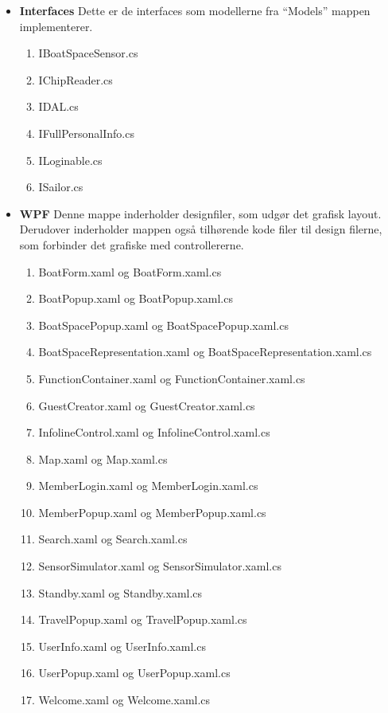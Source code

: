 \begin{itemize}
	\item \textbf{Interfaces} Dette er de interfaces som modellerne fra \enquote{Models} mappen implementerer.
		\begin{enumerate}
			\item IBoatSpaceSensor.cs
			\item IChipReader.cs
			\item IDAL.cs
			\item IFullPersonalInfo.cs
			\item ILoginable.cs
			\item ISailor.cs
		\end{enumerate}
\end{itemize}

\begin{itemize}
	\item \textbf{WPF} Denne mappe inderholder designfiler, som udgør det grafisk layout. Derudover inderholder mappen også tilhørende kode filer til design filerne, som forbinder det grafiske med controllererne.
		\begin{enumerate}
			\item BoatForm.xaml og BoatForm.xaml.cs
			\item BoatPopup.xaml og BoatPopup.xaml.cs
			\item BoatSpacePopup.xaml og BoatSpacePopup.xaml.cs
			\item BoatSpaceRepresentation.xaml og BoatSpaceRepresentation.xaml.cs
			\item FunctionContainer.xaml og FunctionContainer.xaml.cs
			\item GuestCreator.xaml og GuestCreator.xaml.cs
			\item InfolineControl.xaml og InfolineControl.xaml.cs
			\item Map.xaml og Map.xaml.cs
			\item MemberLogin.xaml og MemberLogin.xaml.cs
			\item MemberPopup.xaml og MemberPopup.xaml.cs
			\item Search.xaml og Search.xaml.cs
			\item SensorSimulator.xaml og SensorSimulator.xaml.cs
			\item Standby.xaml og Standby.xaml.cs
			\item TravelPopup.xaml og TravelPopup.xaml.cs
			\item UserInfo.xaml og UserInfo.xaml.cs
			\item UserPopup.xaml og UserPopup.xaml.cs
			\item Welcome.xaml og Welcome.xaml.cs
		\end{enumerate}
\end{itemize}